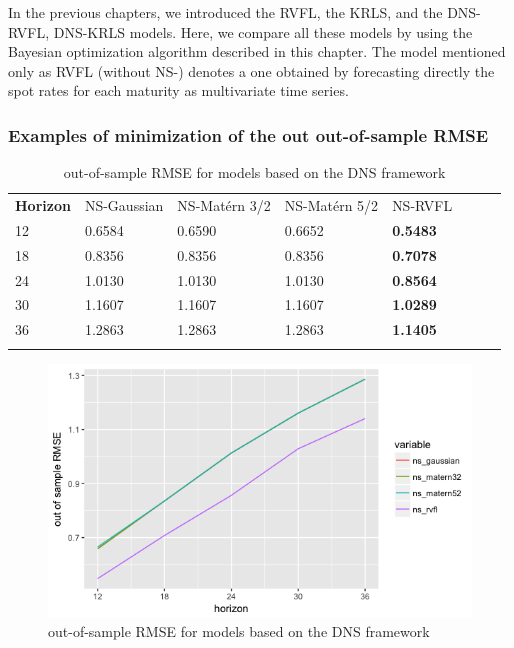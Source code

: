 In the previous chapters, we introduced the RVFL, the KRLS, and the DNS-RVFL, DNS-KRLS models. Here, we compare all these models by using the Bayesian optimization algorithm described in this chapter. The model mentioned only as RVFL (without NS-) denotes a one obtained by forecasting directly the spot rates for each maturity as multivariate time series.   

\subsubsection{Examples of minimization of the out out-of-sample RMSE}


\begin{table}[!htb]
\begin{center}
\caption{out-of-sample RMSE for models based on the DNS framework}
\label{tab:min_value_ns}       %
\begin{tabular}{llllllll}
\hline\noalign{\smallskip}
\textbf{Horizon} & NS-Gaussian & NS-Mat\'ern 3/2  & NS-Mat\'ern 5/2 & NS-RVFL \\
\noalign{\smallskip}\hline\noalign{\smallskip}
 12 & 0.6584  &  0.6590   &   0.6652 & \textbf{0.5483} \\
 18 & 0.8356  &  0.8356   &   0.8356 & \textbf{0.7078} \\
 24 & 1.0130  &  1.0130   &   1.0130 & \textbf{0.8564}\\
 30 & 1.1607  &  1.1607   &   1.1607 & \textbf{1.0289} \\
 36 & 1.2863  &  1.2863   &   1.2863 & \textbf{1.1405} \\
\noalign{\smallskip}\hline
\end{tabular}
\end{center}
\end{table}

\begin{figure}[!htb]
\centering
\includegraphics[width=12cm]{gfx/chapter-bayesianrvfl/oos_ns_krls.png}
\caption{out-of-sample RMSE for models based on the DNS framework}
\label{oos_ns_krls}
\end{figure}

